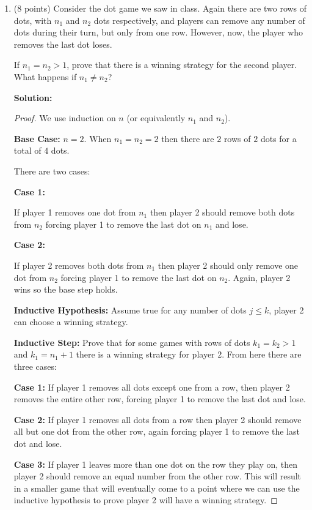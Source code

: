 \documentclass[11pt]{article}
\begin{document}
\begin{enumerate}
\newpage
\item  (8 points)
Consider the dot game we saw in class. Again there are two rows
of dots, with $n_1$ and $n_2$ dots respectively, and players can remove
any number of dots during their turn, but only from one row.
However, now, the player who removes the last dot loses.

If $n_1=n_2 > 1$, prove that there is a winning strategy for the second player.
What happens if $n_1 \not = n_2$?

\textbf{Solution: }
\begin{proof} We use induction on $n$ (or equivalently $n_1$ and $n_2$).

\textbf{Base Case: } $n = 2$.  When $n_1 = n_2 = 2$ then there are $2$ rows of $2$ dots for a total of $4$ dots.  

There are two cases:

\textbf{Case 1: }

If player 1 removes one dot from $n_1$ then player 2 should remove both dots from $n_2$ forcing player 1 to remove the last dot on $n_1$
 and lose.  

\textbf{Case 2: }

If player 2 removes both dots from $n_1$ then player 2 should only remove one dot from $n_2$ forcing player 1 to remove the last dot on $n_2$.  Again, player 2 wins so the base step holds.  

\textbf{Inductive Hypothesis: } Assume true for any number of dots $j \leq k$, player 2 can choose a winning strategy.  

\textbf{Inductive Step: } Prove that for some games with rows of dots $k_1 = k_2 > 1$ and $k_1 = n_1 + 1$ there is a winning strategy 
for player 2.  From here there are three cases:

\textbf{Case 1: } If player 1 removes all dots except one from a row, then player 2 removes the entire other row, forcing player 1 to remove the last dot and lose.  

\textbf{Case 2: } If player 1 removes all dots from a row then player 2 should remove all but one dot from the other row, again forcing player 1 to remove the last dot and lose.  

\textbf{Case 3: } If player 1 leaves more than one dot on the row they play on, then player 2 should remove an equal number from the other row.  This will result in a smaller game that will eventually come to a point where we can use the inductive hypothesis to prove player 2 will have a winning strategy.  


\end{proof}
\end{enumerate}
\end{document}

